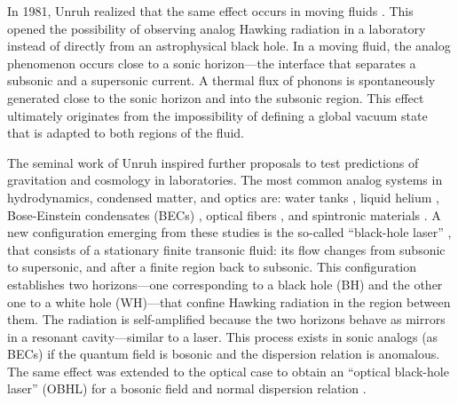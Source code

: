 \documentclass[aps,pra,reprint,amsmath,amssymb,showpacs,groupedaddress,floatfix]{revtex4-1}
\begin{document}
In 1981, Unruh realized that the same effect occurs in moving fluids \cite{Unruh1981}. This opened the possibility of observing analog Hawking radiation in a laboratory instead of directly from an astrophysical black hole. In a moving fluid, the analog phenomenon occurs close to a sonic horizon---the interface that separates a subsonic and a supersonic current. A thermal flux of phonons is spontaneously generated close to the sonic horizon and into the subsonic region. This effect ultimately originates from the impossibility of defining a global vacuum state that is adapted to both regions of the fluid.

The seminal work of Unruh inspired further proposals to test predictions of gravitation and cosmology in laboratories. The most common analog systems in hydrodynamics, condensed matter, and optics are: water tanks \cite{Weinfurtner2011,Euve2016}, liquid helium \cite{Volovik2003,jacobson1998event}, Bose-Einstein condensates (BECs) \cite{zapata2011resonant,2018Bermudez,de2019observation}, optical fibers \cite{philbin2008fiber,drori2019observation}, and spintronic materials \cite{jannes2011hawking}. A new configuration emerging from these studies is the so-called ``black-hole laser'' \cite{Corley1999}, that consists of a stationary finite transonic fluid: its flow changes from subsonic to supersonic, and after a finite region back to subsonic. This configuration establishes two horizons---one corresponding to a black hole (BH) and the other one to a white hole (WH)---that confine Hawking radiation in the region between them. The radiation is self-amplified because the two horizons behave as mirrors in a resonant cavity---similar to a laser. This process exists in sonic analogs (as BECs) if the quantum field is bosonic and the dispersion relation is anomalous. The same effect was extended to the optical case to obtain an ``optical black-hole laser'' (OBHL) for a bosonic field and normal dispersion relation \cite{Faccio2012,GaonaReyes2017}.
\end{document}

